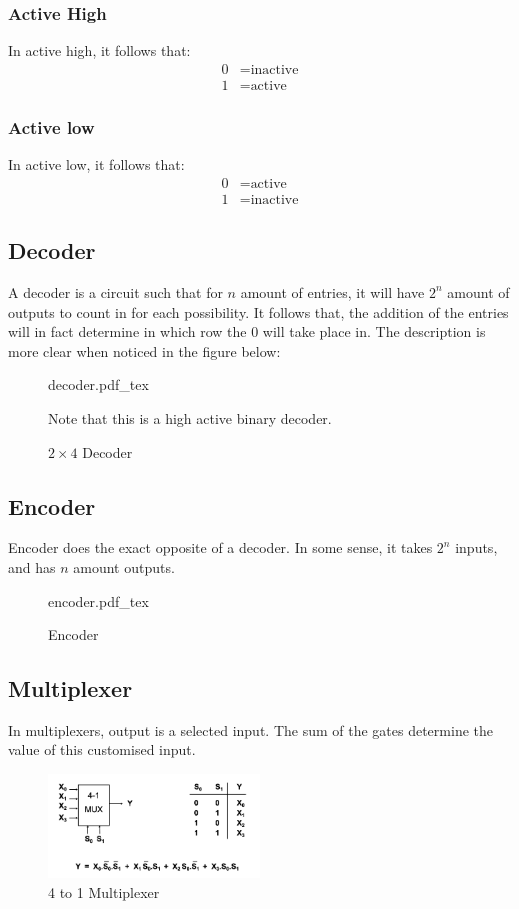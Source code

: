 \documentclass[a4paper]{article}
\newcommand{\incfig}[2][1]{%
    \def\svgwidth{#1\columnwidth}
    {#2.pdf_tex}
}
\theoremstyle{plain}
\theoremstyle{definition}
\theoremstyle{remark}
\begin{document}
\subsubsection{Active High}
In active high, it follows that:
\begin{align*}
	0 &= \text{inactive} \\
	1 &= \text{active}
\end{align*}
\subsubsection{Active low}
In active low, it follows that:
\begin{align*}
	0 &= \text{active} \\
	1 &= \text{inactive}
\end{align*}
\subsection{Decoder}
A decoder is a circuit such that for $n$ amount of entries, it will have $2^{n}$ amount of outputs to count in for each possibility. It follows that, the addition of the entries will in fact determine in which row the $0$ will take place in. The description is more clear when noticed in the figure below:
\begin{figure}[H]
    \centering
    \incfig[0.5]{decoder}
    \caption{$2 \times 4$ Decoder}
    \label{fig:decoder}
    Note that this is a high active binary decoder.
\end{figure}
\subsection{Encoder}
Encoder does the exact opposite of a decoder. In some sense, it takes $2^{n}$ inputs, and has $n$ amount outputs.
\begin{figure}[H]
    \centering
    \incfig[0.5]{encoder}
    \caption{Encoder}
    \label{fig:encoder}
\end{figure}
\subsection{Multiplexer}
In multiplexers, output is a selected input. The sum of the gates determine the value of this customised input.
\begin{figure}[H]
	\centering
	\includegraphics[width=0.5\textwidth]{figures/multiplexer.png}
	\caption{4 to 1 Multiplexer}
	\label{fig:figures-multiplexer-png}
\end{figure}
\end{document}
